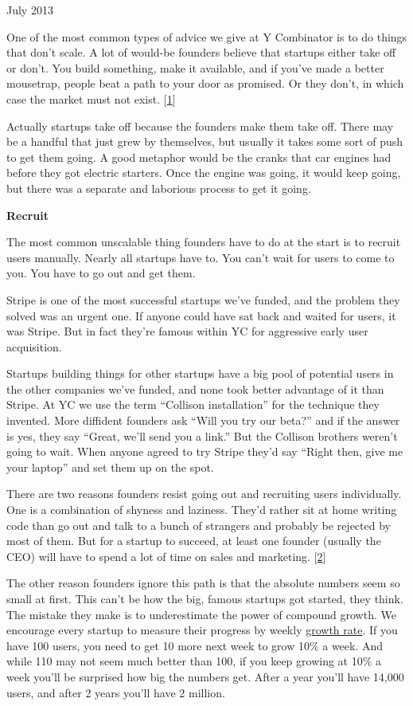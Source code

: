 July 2013

One of the most common types of advice we give at Y Combinator is to do
things that don't scale. A lot of would-be founders believe that
startups either take off or don't. You build something, make it
available, and if you've made a better mousetrap, people beat a path to
your door as promised. Or they don't, in which case the market must not
exist. {[}\hyperref[f1n]{1}{]}

Actually startups take off because the founders make them take off.
There may be a handful that just grew by themselves, but usually it
takes some sort of push to get them going. A good metaphor would be the
cranks that car engines had before they got electric starters. Once the
engine was going, it would keep going, but there was a separate and
laborious process to get it going.

\textbf{Recruit}

The most common unscalable thing founders have to do at the start is to
recruit users manually. Nearly all startups have to. You can't wait for
users to come to you. You have to go out and get them.

Stripe is one of the most successful startups we've funded, and the
problem they solved was an urgent one. If anyone could have sat back and
waited for users, it was Stripe. But in fact they're famous within YC
for aggressive early user acquisition.

Startups building things for other startups have a big pool of potential
users in the other companies we've funded, and none took better
advantage of it than Stripe. At YC we use the term ``Collison
installation'' for the technique they invented. More diffident founders
ask ``Will you try our beta?'' and if the answer is yes, they say
``Great, we'll send you a link.'' But the Collison brothers weren't
going to wait. When anyone agreed to try Stripe they'd say ``Right then,
give me your laptop'' and set them up on the spot.

There are two reasons founders resist going out and recruiting users
individually. One is a combination of shyness and laziness. They'd
rather sit at home writing code than go out and talk to a bunch of
strangers and probably be rejected by most of them. But for a startup to
succeed, at least one founder (usually the CEO) will have to spend a lot
of time on sales and marketing. {[}\hyperref[f2n]{2}{]}

The other reason founders ignore this path is that the absolute numbers
seem so small at first. This can't be how the big, famous startups got
started, they think. The mistake they make is to underestimate the power
of compound growth. We encourage every startup to measure their progress
by weekly \href{growth.html}{growth rate}. If you have 100 users, you
need to get 10 more next week to grow 10\% a week. And while 110 may not
seem much better than 100, if you keep growing at 10\% a week you'll be
surprised how big the numbers get. After a year you'll have 14,000
users, and after 2 years you'll have 2 million.


